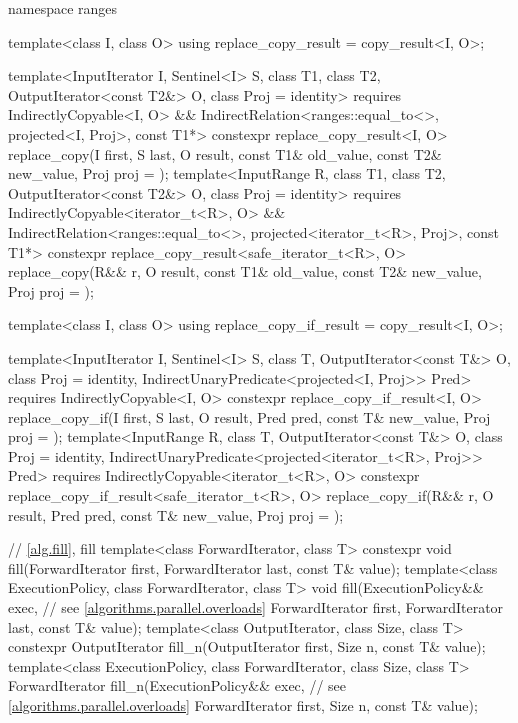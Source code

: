 \begin{codeblock}
{  namespace ranges {
    template<class I, class O>
    using replace_copy_result = copy_result<I, O>;

    template<InputIterator I, Sentinel<I> S, class T1, class T2, OutputIterator<const T2&> O,
        class Proj = identity>
      requires IndirectlyCopyable<I, O> &&
        IndirectRelation<ranges::equal_to<>, projected<I, Proj>, const T1*>
      constexpr replace_copy_result<I, O>
        replace_copy(I first, S last, O result, const T1& old_value, const T2& new_value,
                     Proj proj = {});
    template<InputRange R, class T1, class T2, OutputIterator<const T2&> O,
        class Proj = identity>
      requires IndirectlyCopyable<iterator_t<R>, O> &&
        IndirectRelation<ranges::equal_to<>, projected<iterator_t<R>, Proj>, const T1*>
      constexpr replace_copy_result<safe_iterator_t<R>, O>
        replace_copy(R&& r, O result, const T1& old_value, const T2& new_value,
                     Proj proj = {});

    template<class I, class O>
    using replace_copy_if_result = copy_result<I, O>;

    template<InputIterator I, Sentinel<I> S, class T, OutputIterator<const T&> O,
        class Proj = identity, IndirectUnaryPredicate<projected<I, Proj>> Pred>
      requires IndirectlyCopyable<I, O>
      constexpr replace_copy_if_result<I, O>
        replace_copy_if(I first, S last, O result, Pred pred, const T& new_value,
                        Proj proj = {});
    template<InputRange R, class T, OutputIterator<const T&> O, class Proj = identity,
        IndirectUnaryPredicate<projected<iterator_t<R>, Proj>> Pred>
      requires IndirectlyCopyable<iterator_t<R>, O>
      constexpr replace_copy_if_result<safe_iterator_t<R>, O>
        replace_copy_if(R&& r, O result, Pred pred, const T& new_value,
                        Proj proj = {});
  }

  // \ref{alg.fill}, fill
  template<class ForwardIterator, class T>
    constexpr void fill(ForwardIterator first, ForwardIterator last, const T& value);
  template<class ExecutionPolicy, class ForwardIterator, class T>
    void fill(ExecutionPolicy&& exec, // see \ref{algorithms.parallel.overloads}
              ForwardIterator first, ForwardIterator last, const T& value);
  template<class OutputIterator, class Size, class T>
    constexpr OutputIterator fill_n(OutputIterator first, Size n, const T& value);
  template<class ExecutionPolicy, class ForwardIterator,
           class Size, class T>
    ForwardIterator fill_n(ExecutionPolicy&& exec, // see \ref{algorithms.parallel.overloads}
                           ForwardIterator first, Size n, const T& value);

}
\end{codeblock}
